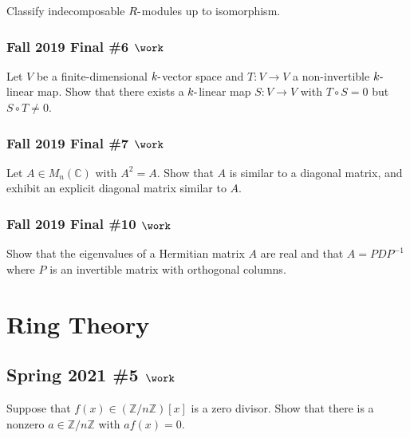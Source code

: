 Classify indecomposable \(R{\hbox{-}}\)modules up to isomorphism.

\hypertarget{fall-2019-final-6-work}{%
\subsubsection{\texorpdfstring{Fall 2019 Final \#6
\(\work\)}{Fall 2019 Final \#6 \textbackslash work}}\label{fall-2019-final-6-work}}

Let \(V\) be a finite-dimensional \(k{\hbox{-}}\)vector space and
\(T:V\to V\) a non-invertible \(k{\hbox{-}}\)linear map. Show that there
exists a \(k{\hbox{-}}\)linear map \(S:V\to V\) with \(T\circ S = 0\)
but \(S\circ T\neq 0\).

\hypertarget{fall-2019-final-7-work}{%
\subsubsection{\texorpdfstring{Fall 2019 Final \#7
\(\work\)}{Fall 2019 Final \#7 \textbackslash work}}\label{fall-2019-final-7-work}}

Let \(A\in M_n({\mathbb{C}})\) with \(A^2 = A\). Show that \(A\) is
similar to a diagonal matrix, and exhibit an explicit diagonal matrix
similar to \(A\).

\hypertarget{fall-2019-final-10-work}{%
\subsubsection{\texorpdfstring{Fall 2019 Final \#10
\(\work\)}{Fall 2019 Final \#10 \textbackslash work}}\label{fall-2019-final-10-work}}

Show that the eigenvalues of a Hermitian matrix \(A\) are real and that
\(A = PDP^{-1}\) where \(P\) is an invertible matrix with orthogonal
columns.

\hypertarget{ring-theory}{%
\section{Ring Theory}\label{ring-theory}}

\hypertarget{spring-2021-5-work}{%
\subsection{\texorpdfstring{Spring 2021 \#5
\(\work\)}{Spring 2021 \#5 \textbackslash work}}\label{spring-2021-5-work}}

Suppose that \(f(x) \in ({\mathbb{Z}}/n{\mathbb{Z}})[x]\) is a zero
divisor. Show that there is a nonzero
\(a\in {\mathbb{Z}}/n{\mathbb{Z}}\) with \(af(x) = 0\).

